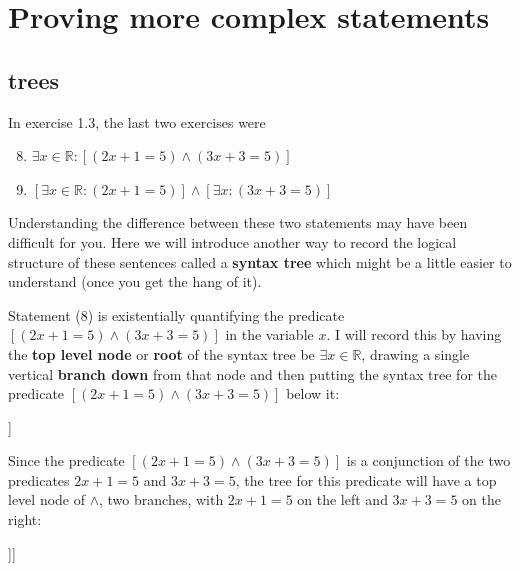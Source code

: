 
\chapter{Proving more complex statements}


\section{trees}

	In exercise 1.3, the last two exercises were

\begin{enumerate}
	\setcounter{enumi}{7}
	
	\item $\exists x \in \mathbb{R}: [(2x+1 = 5) \wedge (3x+3 = 5)]$
	
	\item $[\exists x \in \mathbb{R}: (2x+1 = 5)] \wedge [\exists x: (3x+3 = 5)]$
\end{enumerate}

Understanding the difference between these two statements may have been difficult for you.  Here we will introduce another way to record the logical structure of these sentences called a \textbf{syntax tree} which might be a little easier to understand (once you get the hang of it).

Statement (8) is existentially quantifying the predicate $[(2x+1 = 5) \wedge (3x+3 = 5)]$ in the variable $x$.  I will record this by having the \textbf{top level node} or \textbf{root} of the syntax tree be $\exists x \in \mathbb{R}$, drawing a single vertical \textbf{branch down} from that node and then putting the syntax tree for the predicate $[(2x+1 = 5) \wedge (3x+3 = 5)]$ below it:

\begin{center}
	\begin{forest}
		[\(\exists x \in \mathbb{R}\)[Tree for ``\({(2x+1 = 5) \wedge (3x+3 = 5)}\)'']]
	\end{forest}
\end{center}

Since the predicate $[(2x+1 = 5) \wedge (3x+3 = 5)]$ is a conjunction of the two predicates $2x+1 = 5$ and $3x+3 = 5$, the tree for this predicate will have a top level node of $\wedge$, two branches, with $2x+1 = 5$ on the left and $3x+3 = 5$ on the right:

\begin{center}
	\begin{forest}
		[\(\exists x \in \mathbb{R}\)[\(\wedge\)[\({2x+1 = 5}\)][\({3x+3 = 5}\)]]]
	\end{forest}
\end{center}

